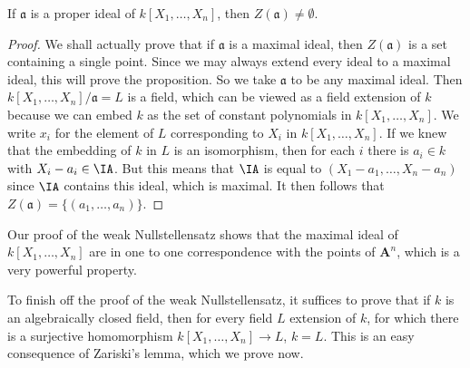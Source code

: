 \begin{lemma}
    If $\mathfrak{a}$ is a proper ideal of $k[X_1, \dots, X_n]$, then $Z(\mathfrak{a}) \neq \emptyset$.
\end{lemma}
\begin{proof}
    We shall actually prove that if $\mathfrak{a}$ is a maximal ideal, then $Z(\mathfrak{a})$ is a set containing a single point. Since we may always extend every ideal to a maximal ideal, this will prove the proposition. So we take $\mathfrak{a}$ to be any maximal ideal. Then $k[X_1, \dots, X_n]/\mathfrak{a} = L$ is a field, which can be viewed as a field extension of $k$ because we can embed $k$ as the set of constant polynomials in $k[X_1, \dots, X_n]$. We write $x_i$ for the element of $L$ corresponding to $X_i$ in $k[X_1,\dots,X_n]$. If we knew that the embedding of $k$ in $L$ is an isomorphism, then for each $i$ there is $a_i \in k$ with $X_i - a_i \in \IA$. But this means that $\IA$ is equal to $(X_1 - a_1, \dots, X_n - a_n)$ since $\IA$ contains this ideal, which is maximal. It then follows that $Z(\mathfrak{a}) = \{ (a_1, \dots, a_n) \}$.
\end{proof}

\begin{remark}
    Our proof of the weak Nullstellensatz shows that the maximal ideal of $k[X_1,\dots,X_n]$ are in one to one correspondence with the points of $\mathbf{A}^n$, which is a very powerful property.
\end{remark}


To finish off the proof of the weak Nullstellensatz, it suffices to prove that if $k$ is an algebraically closed field, then for every field $L$ extension of $k$, for which there is a surjective homomorphism $k[X_1,\dots,X_n] \to L$, $k = L$. This is an easy consequence of Zariski's lemma, which we prove now.

